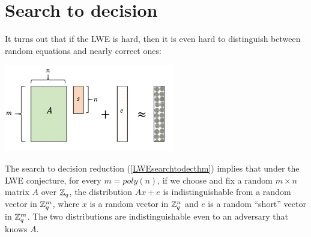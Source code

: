 \section{Search to decision}\label{11-Search-to-decision}

It turns out that if the LWE is hard, then it is even hard to
distinguish between random equations and nearly correct ones:

\begin{marginfigure}
\centering
\includegraphics[width=\linewidth, height=1.5in, keepaspectratio]{../figure/lwevecindist.png}
\caption{The search to decision reduction (\cref{LWEsearchtodecthm})
implies that under the LWE conjecture, for every \(m=poly(n)\), if we
choose and fix a random \(m\times n\) matrix \(A\) over \({\mathbb{Z}}_q\), the
distribution \(Ax+e\) is indistinguishable from a random vector in
\({\mathbb{Z}}_q^m\), where \(x\) is a random vector in \({\mathbb{Z}}_q^n\) and \(e\) is a
random ``short'' vector in \({\mathbb{Z}}_q^m\). The two distributions are
indistinguishable even to an adversary that knows \(A\).}
\label{figid}
\end{marginfigure}

\hypertarget{LWEsearchtodecthm}{}

